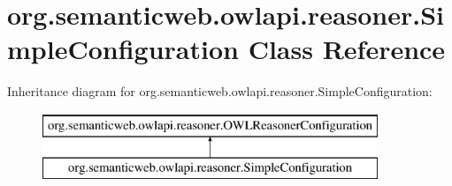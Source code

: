 \hypertarget{classorg_1_1semanticweb_1_1owlapi_1_1reasoner_1_1_simple_configuration}{\section{org.\-semanticweb.\-owlapi.\-reasoner.\-Simple\-Configuration Class Reference}
\label{classorg_1_1semanticweb_1_1owlapi_1_1reasoner_1_1_simple_configuration}
}
Inheritance diagram for org.\-semanticweb.\-owlapi.\-reasoner.\-Simple\-Configuration\-:\begin{figure}[H]
\begin{center}
\leavevmode
\includegraphics[height=2.000000cm]{classorg_1_1semanticweb_1_1owlapi_1_1reasoner_1_1_simple_configuration}
\end{center}
\end{figure}
